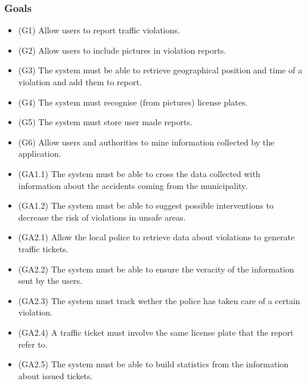 \subsubsection{Goals}
\begin{itemize}
	\item (G1) 	Allow users to report traffic violations. \newline	
	\item (G2)	Allow users to include pictures in violation reports. \newline
	\item (G3)	The system must be able to retrieve geographical position and time of a violation and add them to report.\newline
	\item (G4)	The system must recognise (from pictures) license plates.\newline
	\item (G5) 	The system must store user made reports.\newline
	\item (G6)	Allow users and authorities to mine information collected by the application. \newline
	\item (GA1.1)	The system must be able to cross the data collected with information about the accidents coming from the municipality. \newline
	\item (GA1.2)	The system must be able to suggest possible interventions to decrease the risk of violations in unsafe areas. \newline
	\item (GA2.1)	Allow the local police to retrieve data about violations to generate traffic tickets. \newline
	\item (GA2.2)	The system must be able to ensure the veracity of the information sent by the users. \newline
	\item (GA2.3)	The system must track wether the police has taken care of a certain violation. \newline
	\item (GA2.4)	A traffic ticket must involve the same license plate that the report refer to. \newline
	\item (GA2.5)	The system must be able to build statistics from the information about issued tickets. 
\end{itemize}

